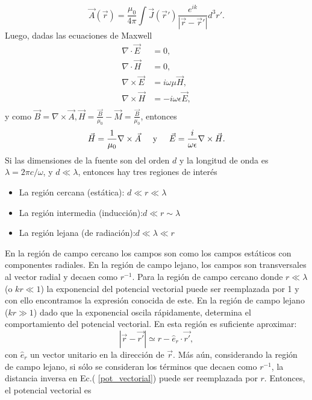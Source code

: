 \documentclass[paper=letter, fontsize=12pt,]{article}
\begin{document}
\begin{equation}
\Vec{A}(\Vec{r})=\frac{\mu_0}{4\pi}\int \Vec{J}(\Vec{r}')\frac{e^{ik}}{|\Vec{r}-\Vec{r}'|} d^3r'.
\end{equation}
Luego, dadas las ecuaciones de Maxwell
\begin{align}
    \nabla\cdot\Vec{E}&=0,\\
    \nabla\cdot\Vec{H}&=0,\\
    \nabla\times\Vec{E}&=i\omega\mu\Vec{H},\\
    \nabla\times\Vec{H}&=-i\omega\epsilon\Vec{E},\\
\end{align}
y como $\Vec{B}=\nabla\times\Vec{A}, \Vec{H}=\frac{\Vec{B}}{\mu_0}-\Vec{M}=\frac{\Vec{B}}{\mu_0}$, entonces 
\begin{equation}
    \Vec{H}=\frac{1}{\mu_0}\nabla\times\Vec{A}\hspace{0.5cm}\mbox{y}\hspace{0.5cm}    \Vec{E}=\frac{i}{\omega\epsilon}\nabla\times\Vec{H}.
\end{equation}
Si las dimensiones de la fuente son del orden $d$ y la longitud de onda es $\lambda=2\pi c/\omega$, y $d\ll\lambda$, entonces hay tres regiones de interés \cite{Jackson}
\begin{itemize}
    \item La región cercana (estática): \hspace{2.4cm}$d\ll r\ll\lambda$
    \item La región intermedia (inducción):\hspace{1.7cm}$d\ll r\sim \lambda$
    \item La región lejana (de radiación):\hspace{2cm}$d\ll \lambda\ll r$
\end{itemize}
En la región de campo cercano los campos son como los campos estáticos con componentes radiales. En la región de campo lejano, los campos son transversales al vector radial y decaen como $r^{-1}$. 
Para la región de campo cercano donde $r\ll\lambda$ (o $kr\ll 1$) la exponencial del potencial vectorial puede ser reemplazada por 1 y con ello encontramos la expresión conocida de este.
En la región de campo lejano ($kr\gg 1$) dado que la exponencial oscila rápidamente, determina el comportamiento del potencial vectorial. En esta región es suficiente aproximar:
\begin{equation}
    |\Vec{r}-\Vec{r'}|\simeq r-\hat{e}_r\cdot\Vec{r'},    
\end{equation}
con $\hat{e}_r$ un vector unitario en la dirección de $\Vec{r}$. Más aún, considerando la región de campo lejano, si sólo se consideran los términos que decaen como $r^{-1}$, la distancia inversa en Ec.( \ref{pot_vectorial}) puede ser reemplazada por $r$. Entonces, el potencial vectorial es
\end{document}
